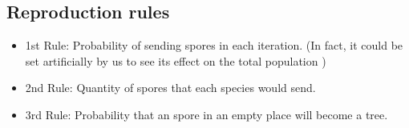 \documentclass [12pt]{article}
\begin{document}
\subsection*{Reproduction rules}


\begin{itemize}
\item 1st Rule: Probability of sending spores in each iteration. (In fact, it could be set artificially by us to see its effect on the total population )
\item 2nd Rule:  Quantity of spores that each species would send.
\item 3rd Rule: Probability that an spore in an empty place will become a tree. 
\end{itemize}
\end{document}

